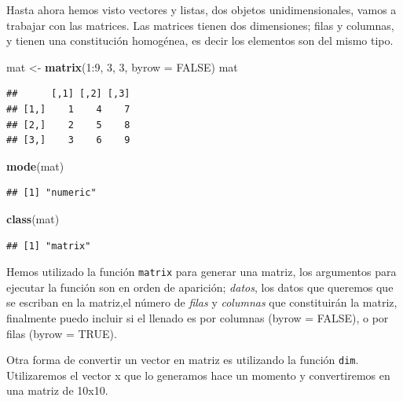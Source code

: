 \documentclass[]{article}
\newenvironment{Shaded}{\begin{snugshade}}{\end{snugshade}}
\newcommand{\KeywordTok}[1]{\textcolor[rgb]{0.13,0.29,0.53}{\textbf{{#1}}}}
\newcommand{\DataTypeTok}[1]{\textcolor[rgb]{0.13,0.29,0.53}{{#1}}}
\newcommand{\DecValTok}[1]{\textcolor[rgb]{0.00,0.00,0.81}{{#1}}}
\newcommand{\StringTok}[1]{\textcolor[rgb]{0.31,0.60,0.02}{{#1}}}
\newcommand{\OtherTok}[1]{\textcolor[rgb]{0.56,0.35,0.01}{{#1}}}
\newcommand{\NormalTok}[1]{{#1}}
\begin{document}
Hasta ahora hemos visto vectores y listas, dos objetos unidimensionales,
vamos a trabajar con las matrices. Las matrices tienen dos dimensiones;
filas y columnas, y tienen una constitución homogénea, es decir los
elementos son del mismo tipo.

\begin{Shaded}
\begin{Highlighting}[]
\NormalTok{mat <-}\StringTok{ }\KeywordTok{matrix}\NormalTok{(}\DecValTok{1}\NormalTok{:}\DecValTok{9}\NormalTok{, }\DecValTok{3}\NormalTok{, }\DecValTok{3}\NormalTok{, }\DataTypeTok{byrow =} \OtherTok{FALSE}\NormalTok{)}
\NormalTok{mat}
\end{Highlighting}
\end{Shaded}

\begin{verbatim}
##      [,1] [,2] [,3]
## [1,]    1    4    7
## [2,]    2    5    8
## [3,]    3    6    9
\end{verbatim}

\begin{Shaded}
\begin{Highlighting}[]
\KeywordTok{mode}\NormalTok{(mat)}
\end{Highlighting}
\end{Shaded}

\begin{verbatim}
## [1] "numeric"
\end{verbatim}

\begin{Shaded}
\begin{Highlighting}[]
\KeywordTok{class}\NormalTok{(mat)}
\end{Highlighting}
\end{Shaded}

\begin{verbatim}
## [1] "matrix"
\end{verbatim}

Hemos utilizado la función \texttt{matrix} para generar una matriz, los
argumentos para ejecutar la función son en orden de aparición;
\emph{datos}, los datos que queremos que se escriban en la matriz,el
número de \emph{filas} y \emph{columnas} que constituirán la matriz,
finalmente puedo incluir si el llenado es por columnas (byrow = FALSE),
o por filas (byrow = TRUE).

Otra forma de convertir un vector en matriz es utilizando la función
\texttt{dim}. Utilizaremos el vector x que lo generamos hace un momento
y convertiremos en una matriz de 10x10.
\end{document}
